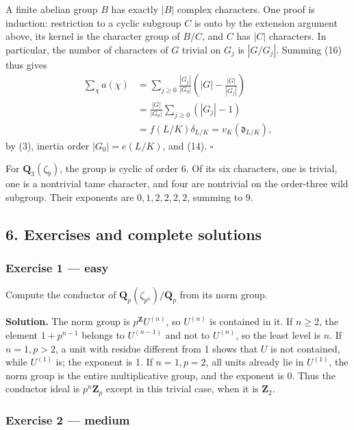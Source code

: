 \documentclass[11pt,a4paper]{article}
\begin{document}
A finite abelian group \(B\) has exactly \(|B|\) complex characters. One
proof is induction: restriction to a cyclic subgroup \(C\) is onto by
the extension argument above, its kernel is the character group of
\(B/C\), and \(C\) has \(|C|\) characters. In particular, the number of
characters of \(G\) trivial on \(G_j\) is \(|G/G_j|\). Summing (16) thus
gives \[
\begin{aligned}
\sum_\chi a(\chi)
 &=\sum_{j\geq0}\frac{|G_j|}{|G_0|}
                \left(|G|-\frac{|G|}{|G_j|}\right)\\
 &=\frac{|G|}{|G_0|}\sum_{j\geq0}(|G_j|-1)\\
 &=f(L/K)\delta_{L/K}
 =v_K(\mathfrak d_{L/K}),
\end{aligned}
\] by (3), inertia order \(|G_0|=e(L/K)\), and (14). \(\square\)

For \(\mathbf Q_3(\zeta_9)\), the group is cyclic of order 6. Of its six
characters, one is trivial, one is a nontrivial tame character, and four
are nontrivial on the order-three wild subgroup. Their exponents are
\(0,1,2,2,2,2\), summing to 9.

\subsection{6. Exercises and complete
solutions}\label{exercises-and-complete-solutions}

\subsubsection{Exercise 1 --- easy}\label{exercise-1-easy}

Compute the conductor of \(\mathbf Q_p(\zeta_{p^n})/\mathbf Q_p\) from
its norm group.

\textbf{Solution.} The norm group is \(p^{\mathbf Z}U^{(n)}\), so
\(U^{(n)}\) is contained in it. If \(n\geq2\), the element \(1+p^{n-1}\)
belongs to \(U^{(n-1)}\) and not to \(U^{(n)}\), so the least level is
\(n\). If \(n=1,p>2\), a unit with residue different from 1 shows that
\(U\) is not contained, while \(U^{(1)}\) is; the exponent is 1. If
\(n=1,p=2\), all units already lie in \(U^{(1)}\), the norm group is the
entire multiplicative group, and the exponent is 0. Thus the conductor
ideal is \(p^n\mathbf Z_p\) except in this trivial case, when it is
\(\mathbf Z_2\).

\subsubsection{Exercise 2 --- medium}\label{exercise-2-medium}
\end{document}
